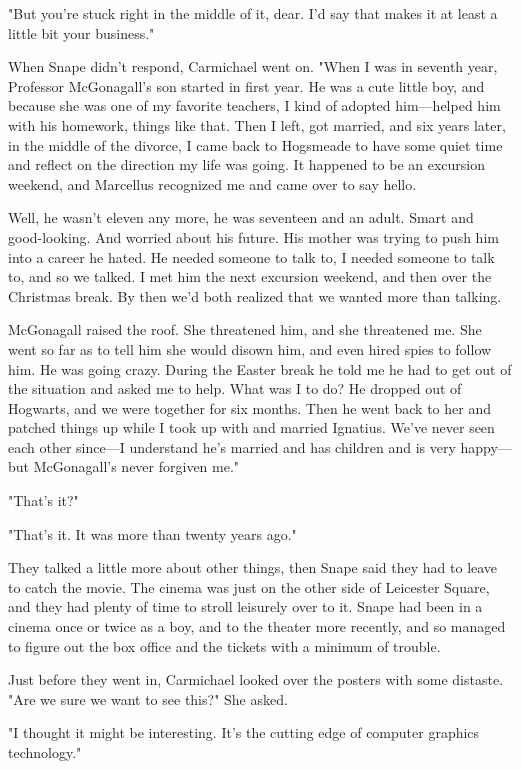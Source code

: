 "But you're stuck right in the middle of it, dear. I'd say that makes it at least a little bit your business."

When Snape didn't respond, Carmichael went on. "When I was in seventh year, Professor McGonagall's son started in first year. He was a cute little boy, and because she was one of my favorite teachers, I kind of adopted him—helped him with his homework, things like that. Then I left, got married, and six years later, in the middle of the divorce, I came back to Hogsmeade to have some quiet time and reflect on the direction my life was going. It happened to be an excursion weekend, and Marcellus recognized me and came over to say hello.

\textooquote Well, he wasn't eleven any more, he was seventeen and an adult. Smart and good-looking. And worried about his future. His mother was trying to push him into a career he hated. He needed someone to talk to, I needed someone to talk to, and so we talked. I met him the next excursion weekend, and then over the Christmas break. By then we'd both realized that we wanted more than talking.

\textooquote McGonagall raised the roof. She threatened him, and she threatened me. She went so far as to tell him she would disown him, and even hired spies to follow him. He was going crazy. During the Easter break he told me he had to get out of the situation and asked me to help. What was I to do? He dropped out of Hogwarts, and we were together for six months. Then he went back to her and patched things up while I took up with and married Ignatius. We've never seen each other since—I understand he's married and has children and is very happy—but McGonagall's never forgiven me."

"That's it?"

"That's it. It was more than twenty years ago."

They talked a little more about other things, then Snape said they had to leave to catch the movie. The cinema was just on the other side of Leicester Square, and they had plenty of time to stroll leisurely over to it. Snape had been in a cinema once or twice as a boy, and to the theater more recently, and so managed to figure out the box office and the tickets with a minimum of trouble.

Just before they went in, Carmichael looked over the posters with some distaste. "Are we sure we want to see this?" She asked.

"I thought it might be interesting. It's the cutting edge of computer graphics technology."

